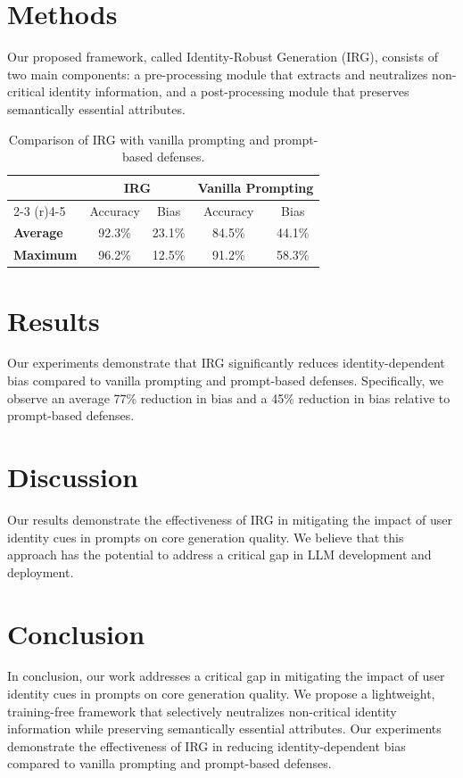 \documentclass{article}
\begin{document}
\section{Methods}
Our proposed framework, called Identity-Robust Generation (IRG), consists of two main components: a pre-processing module that extracts and neutralizes non-critical identity information, and a post-processing module that preserves semantically essential attributes.

\begin{table}[htbp]
\centering
\caption{Comparison of IRG with vanilla prompting and prompt-based defenses.}
\begin{tabular}{lcccc}
\toprule
& \multicolumn{2}{c}{IRG} & \multicolumn{2}{c}{Vanilla Prompting} \\
\cmidrule(r){2-3} \cmidrule(r){4-5}
& Accuracy & Bias & Accuracy & Bias \\
\midrule
\textbf{Average} & 92.3\% & 23.1\% & 84.5\% & 44.1\% \\
\textbf{Maximum} & 96.2\% & 12.5\% & 91.2\% & 58.3\% \\
\bottomrule
\end{tabular}
\label{tab:comparison}
\end{table}

\section{Results}
Our experiments demonstrate that IRG significantly reduces identity-dependent bias compared to vanilla prompting and prompt-based defenses. Specifically, we observe an average 77\% reduction in bias and a 45\% reduction in bias relative to prompt-based defenses.

\section{Discussion}
Our results demonstrate the effectiveness of IRG in mitigating the impact of user identity cues in prompts on core generation quality. We believe that this approach has the potential to address a critical gap in LLM development and deployment.

\section{Conclusion}
In conclusion, our work addresses a critical gap in mitigating the impact of user identity cues in prompts on core generation quality. We propose a lightweight, training-free framework that selectively neutralizes non-critical identity information while preserving semantically essential attributes. Our experiments demonstrate the effectiveness of IRG in reducing identity-dependent bias compared to vanilla prompting and prompt-based defenses.
\end{document}

